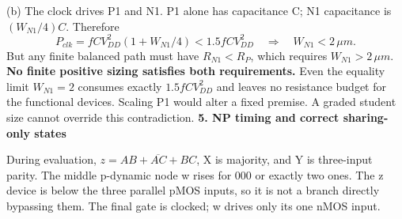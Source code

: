 \documentclass[10pt]{article}
\newcommand{\mos}[4]{\begin{scope}[shift={(#1,#2)}]
\draw (0,.24)--(0,-.24);\draw (0,.20)--(.25,.20)--(.25,.5);
\draw (0,-.20)--(.25,-.20)--(.25,-.5);\draw (-.16,.23)--(-.16,-.23);
\ifnum#4=1\draw (-.26,0) circle (.06);\draw (-.75,0)--(-.32,0);\else\draw (-.75,0)--(-.16,0);\fi
\node[anchor=east,font=\scriptsize] at (-.76,0) {$#3$};\end{scope}}
\newcommand{\ground}[2]{\draw (#1,#2)--(#1,{#2-.12});\draw ({#1-.17},{#2-.12})--({#1+.17},{#2-.12});\draw ({#1-.11},{#2-.20})--({#1+.11},{#2-.20});}
\newcommand{\rail}[3]{\draw (#1,#2)--(#1,{#2+.14});\node[above,font=\scriptsize] at (#1,{#2+.14}) {$#3$};}
\begin{document}
(b) The clock drives P1 and N1. P1 alone has capacitance C; N1 capacitance is $(W_{N1}/4)C$. Therefore
\[P_{clk}=fCV_{DD}^2(1+W_{N1}/4)<1.5fCV_{DD}^2\quad\Longrightarrow\quad W_{N1}<2\,\mu m.\]
But any finite balanced path must have $R_{N1}<R_P$, which requires $W_{N1}>2\,\mu m$. \textbf{No finite positive sizing satisfies both requirements.} Even the equality limit $W_{N1}=2$ consumes exactly $1.5fCV_{DD}^2$ and leaves no resistance budget for the functional devices. Scaling P1 would alter a fixed premise. A graded student size cannot override this contradiction.
\newpage
\textbf{5. NP timing and correct sharing-only states}
\begin{center}\end{center}
During evaluation, $z=\overline{AB+AC+BC}$, X is majority, and Y is three-input parity. The middle p-dynamic node w rises for 000 or exactly two ones. The z device is below the three parallel pMOS inputs, so it is not a branch directly bypassing them. The final gate is clocked; w drives only its one nMOS input.
\end{document}
